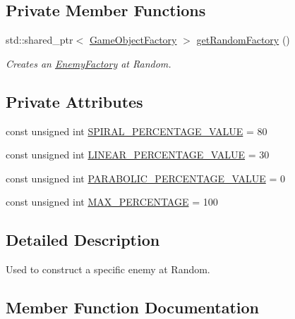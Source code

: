 \subsection*{Private Member Functions}
\begin{DoxyCompactItemize}
\item 
std\+::shared\+\_\+ptr$<$ \hyperlink{class_game_object_factory}{Game\+Object\+Factory} $>$ \hyperlink{class_random_enemy_factory_a8a9643918f3e727aac7e41c6187a9d9a}{get\+Random\+Factory} ()
\begin{DoxyCompactList}\small\item\em Creates an \hyperlink{class_enemy_factory}{Enemy\+Factory} at Random. \end{DoxyCompactList}\end{DoxyCompactItemize}
\subsection*{Private Attributes}
\begin{DoxyCompactItemize}
\item 
const unsigned int \hyperlink{class_random_enemy_factory_ac912e49add9d56e8b12d3881ce1cc656}{S\+P\+I\+R\+A\+L\+\_\+\+P\+E\+R\+C\+E\+N\+T\+A\+G\+E\+\_\+\+V\+A\+L\+UE} = 80
\item 
const unsigned int \hyperlink{class_random_enemy_factory_ad52b65e560c09a560d7be11c97997f5c}{L\+I\+N\+E\+A\+R\+\_\+\+P\+E\+R\+C\+E\+N\+T\+A\+G\+E\+\_\+\+V\+A\+L\+UE} = 30
\item 
const unsigned int \hyperlink{class_random_enemy_factory_a64c95136e3e30f504755037e3f804372}{P\+A\+R\+A\+B\+O\+L\+I\+C\+\_\+\+P\+E\+R\+C\+E\+N\+T\+A\+G\+E\+\_\+\+V\+A\+L\+UE} = 0
\item 
const unsigned int \hyperlink{class_random_enemy_factory_ac3e384acfa1fa3927d3a3643647072e9}{M\+A\+X\+\_\+\+P\+E\+R\+C\+E\+N\+T\+A\+GE} = 100
\end{DoxyCompactItemize}


\subsection{Detailed Description}
Used to construct a specific enemy at Random. 

\subsection{Member Function Documentation}
\mbox{\label{class_random_enemy_factory_a5099fcf010a5cf2f53fd7c874a1925a9}} 
